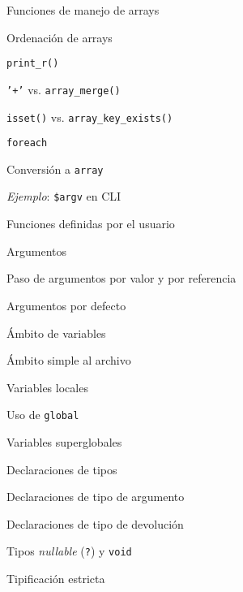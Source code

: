 \begin{longenum}
\begin{longenum}
\begin{longenum}
\begin{longenum}
            \end{longenum}
            \item Funciones de manejo de arrays
            \begin{longenum}
                \item Ordenación de arrays
                \item \texttt{print\_r()}
                \item \texttt{'+'} vs. \texttt{array\_merge()}
                \item \texttt{isset()} vs. \texttt{array\_key\_exists()}
            \end{longenum}
            \item \texttt{foreach}
            \item Conversión a \texttt{array} 
            \item \textit{Ejemplo}: \texttt{\$argv} en CLI
        \end{longenum}
        \item Funciones definidas por el usuario
        \begin{longenum}
            \item Argumentos
            \begin{longenum}
                \item Paso de argumentos por valor y por referencia
                \item Argumentos por defecto
            \end{longenum}
            \item Ámbito de variables
            \begin{longenum}
                \item Ámbito simple al archivo
                \item Variables locales
                \item Uso de \texttt{global}
                \item Variables superglobales
            \end{longenum}
            \item Declaraciones de tipos
            \begin{longenum}
                \item Declaraciones de tipo de argumento
                \item Declaraciones de tipo de devolución
                \item Tipos \textit{nullable} (\texttt{?}) y \texttt{void}
                \item Tipificación estricta

\end{longenum}
\end{longenum}
\end{longenum}
\end{longenum}
